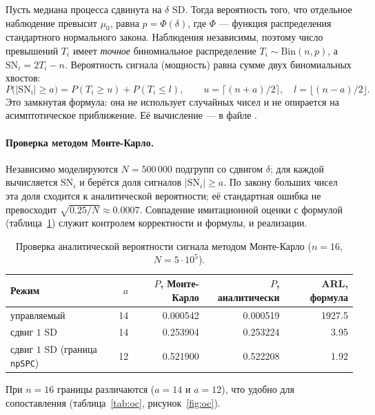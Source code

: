 \documentclass[11pt,a4paper]{article}
\newcommand{\SN}{\mathrm{SN}}
\begin{document}
Пусть медиана процесса сдвинута на $\delta$ SD. Тогда вероятность того, что
отдельное наблюдение превысит $\mu_0$, равна $p=\Phi(\delta)$, где $\Phi$ ---
функция распределения стандартного нормального закона. Наблюдения
независимы, поэтому число превышений $T_i$ имеет \emph{точное} биномиальное
распределение $T_i\sim\mathrm{Bin}(n,p)$, а $\SN_i=2T_i-n$. Вероятность
сигнала (мощность) равна сумме двух биномиальных хвостов:
\begin{equation}
  P\bigl(|\SN_i|\ge a\bigr)=P(T_i\ge u)+P(T_i\le l),
  \qquad u=\bigl\lceil (n+a)/2\bigr\rceil,\quad
  l=\bigl\lfloor (n-a)/2\bigr\rfloor .
  \label{eq:power}
\end{equation}
Это замкнутая формула: она не использует случайных чисел и не опирается на
асимптотическое приближение. Её вычисление --- в файле
.

\paragraph{Проверка методом Монте-Карло.}
Независимо моделируются $N=500\,000$ подгрупп со сдвигом $\delta$; для
каждой вычисляется $\SN_i$ и берётся доля сигналов $|\SN_i|\ge a$. По
закону больших чисел эта доля сходится к аналитической вероятности; её
стандартная ошибка не превосходит $\sqrt{0.25/N}\approx0.0007$. Совпадение
имитационной оценки с формулой (таблица~\ref{tab:montecarlo}) служит
контролем корректности и формулы, и реализации.

\begin{table}[htbp]\centering
\caption{Проверка аналитической вероятности сигнала методом Монте-Карло
($n=16$, $N=5\cdot10^5$).}
\label{tab:montecarlo}
\small
\begin{tabular}{@{}l r r r r@{}}
\toprule
Режим & $a$ & $P$, Монте-Карло & $P$, аналитически & ARL, формула \\
\midrule
управляемый                            & 14 & 0.000542 & 0.000519 & 1927.5 \\
сдвиг $1$ SD                           & 14 & 0.253904 & 0.253224 &    3.95 \\
сдвиг $1$ SD (граница \texttt{npSPC})  & 12 & 0.521900 & 0.522208 &    1.92 \\
\bottomrule
\end{tabular}
\end{table}

При $n=16$ границы различаются ($a=14$ и $a=12$), что удобно для
сопоставления (таблица~\ref{tab:oc}, рисунок~\ref{fig:oc}).
\end{document}
